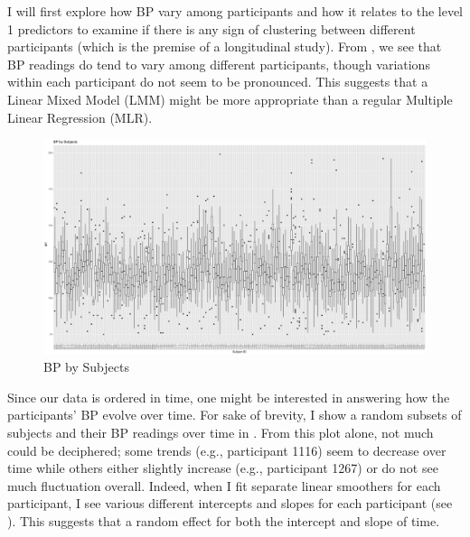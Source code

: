 \documentclass[12pt,twoside,leqno,fleqn,letterpaper]{article}
\theoremstyle{definition}
\theoremstyle{definition}
\begin{document}
I will first explore how BP vary among participants and how it relates to the level 1 predictors to examine if there is any sign of clustering between different participants (which is the premise of a longitudinal study). From , we see that BP readings do tend to vary among different participants, though variations within each participant do not seem to be pronounced. This suggests that a Linear Mixed Model (LMM) might be more appropriate than a regular Multiple Linear Regression (MLR).

\begin{figure} 
    \centering
    \includegraphics[width=\textwidth]{pics/bp by subjects.png}
    \caption{BP by Subjects}
    \label{fig: bp by subjects}
    \end{figure}

Since our data is ordered in time, one might be interested in answering how the participants' BP evolve over time. For sake of brevity, I show a random subsets of subjects and their BP readings over time in . From this plot alone, not much could be deciphered; some trends (e.g., participant 1116) seem to decrease over time while others either slightly increase (e.g., participant 1267) or do not see much fluctuation overall. Indeed, when I fit separate linear smoothers for each participant, I see various different intercepts and slopes for each participant (see ). This suggests that a random effect for both the intercept and slope of time.
\end{document}
